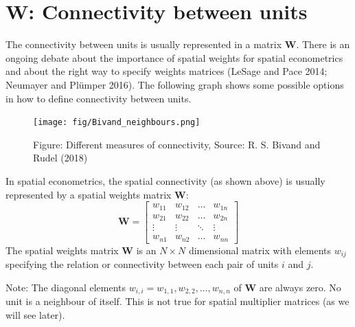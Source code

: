 \documentclass[
  letterpaper,
  DIV=11,
  numbers=noendperiod]{scrreprt}
\begin{document}
\hypertarget{boldsymbolmathbfw-connectivity-between-units}{%
\section{\texorpdfstring{\(\boldsymbol{\mathbf{W}}\): Connectivity
between
units}{\textbackslash boldsymbol\{\textbackslash mathbf\{W\}\}: Connectivity between units}}\label{boldsymbolmathbfw-connectivity-between-units}}

The connectivity between units is usually represented in a matrix
\(\boldsymbol{\mathbf{W}}\). There is an ongoing debate about the
importance of spatial weights for spatial econometrics and about the
right way to specify weights matrices (LeSage and Pace 2014; Neumayer
and Plümper 2016). The following graph shows some possible options in
how to define connectivity between units.

\begin{figure}

{\centering \texttt{[image: fig/Bivand\_neighbours.png]}

}

\caption{Figure: Different measures of connectivity, Source: R. S.
Bivand and Rudel (2018)}

\end{figure}

In spatial econometrics, the spatial connectivity (as shown above) is
usually represented by a spatial weights matrix
\({\boldsymbol{\mathbf{W}}}\): \[
\begin{equation} 
        \boldsymbol{\mathbf{W}} = \begin{bmatrix} 
            w_{11} & w_{12} & \dots & w_{1n} \\
            w_{21} & w_{22} & \dots & w_{2n} \\
            \vdots & \vdots & \ddots & \vdots \\
            w_{n1} & w_{n2} & \dots     & w_{nn} 
            \end{bmatrix}
        \end{equation}
\] The spatial weights matrix \(\boldsymbol{\mathbf{W}}\) is an
\(N \times N\) dimensional matrix with elements \(w_{ij}\) specifying
the relation or connectivity between each pair of units \(i\) and \(j\).

Note: The diagonal elements
\(w_{i,i}= w_{1,1}, w_{2,2}, \dots, w_{n,n}\) of
\(\boldsymbol{\mathbf{W}}\) are always zero. No unit is a neighbour of
itself. This is not true for spatial multiplier matrices (as we will see
later).
\end{document}
